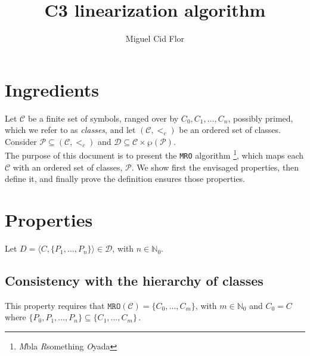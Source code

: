 \documentclass{article}
\title{C3 linearization algorithm}
\author{Miguel Cid Flor}
\newcommand*{\CC}{\ensuremath{\mathcal{C}}\xspace}
\newcommand*{\ordCC}{\ensuremath{(\mathcal{C}, <_c)}\xspace}
\newcommand*{\mro}{\texttt{MRO}}
\newcommand*{\natz}{\ensuremath{\mathbb{N}_0}}
\begin{document}
\maketitle

\section*{Ingredients}

Let \CC be a finite set of symbols, ranged over by \( C_0, C_1, \ldots, C_n \), possibly primed, which we refer to as \emph{classes}, and let \ordCC be an ordered set of classes. %
Consider $\mathcal P \subseteq \ordCC$ and $\mathcal{D} \subseteq \CC \times \wp{(\mathcal P)}$.\\

The purpose of this document is to present the \texttt{MRO} algorithm%
\footnote{\emph{M}bla \emph{R}something \emph{O}yada},
which maps each $\CC$ with an ordered set of classes, $\mathcal P$. We show first the envisaged properties, then define it, and finally prove the definition ensures those properties.


\section*{Properties}

Let $D = \langle C, \{P_1, \dots, P_n\} \rangle \in \mathcal{D}$, with $n\in\natz$.
\subsection*{Consistency with the hierarchy of classes} 
This property requires that %
$\mro(\CC) = \{C_0, \dots, C_m\}$, with $m \in \natz$ and $C_0 = C$ where
\(
\{P_0, P_1, \dots, P_n\} \subseteq \{C_1, \dots, C_m\}\,.
\)

\end{document}
